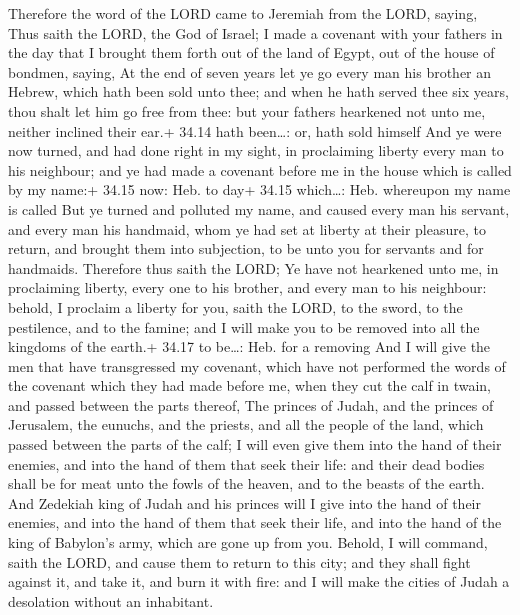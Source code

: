  Therefore the word of the LORD came to Jeremiah from the
LORD, saying,  Thus saith the LORD, the God of Israel; I
made a covenant with your fathers in the day that I brought them forth
out of the land of Egypt, out of the house of bondmen, saying,
 At the end of seven years let ye go every man his brother
an Hebrew, which hath been sold unto thee; and when he hath served thee
six years, thou shalt let him go free from thee: but your fathers
hearkened not unto me, neither inclined their ear.+ 34.14 hath
been\ldots: or, hath sold himself  And ye were now turned,
and had done right in my sight, in proclaiming liberty every man to his
neighbour; and ye had made a covenant before me in the house which is
called by my name:+ 34.15 now: Heb. to day+ 34.15 which\ldots: Heb.
whereupon my name is called  But ye turned and polluted my
name, and caused every man his servant, and every man his handmaid, whom
ye had set at liberty at their pleasure, to return, and brought them
into subjection, to be unto you for servants and for handmaids.
 Therefore thus saith the LORD; Ye have not hearkened unto
me, in proclaiming liberty, every one to his brother, and every man to
his neighbour: behold, I proclaim a liberty for you, saith the LORD, to
the sword, to the pestilence, and to the famine; and I will make you to
be removed into all the kingdoms of the earth.+ 34.17 to be\ldots: Heb.
for a removing  And I will give the men that have
transgressed my covenant, which have not performed the words of the
covenant which they had made before me, when they cut the calf in twain,
and passed between the parts thereof,  The princes of
Judah, and the princes of Jerusalem, the eunuchs, and the priests, and
all the people of the land, which passed between the parts of the calf;
 I will even give them into the hand of their enemies, and
into the hand of them that seek their life: and their dead bodies shall
be for meat unto the fowls of the heaven, and to the beasts of the
earth.  And Zedekiah king of Judah and his princes will I
give into the hand of their enemies, and into the hand of them that seek
their life, and into the hand of the king of Babylon's army, which are
gone up from you.  Behold, I will command, saith the LORD,
and cause them to return to this city; and they shall fight against it,
and take it, and burn it with fire: and I will make the cities of Judah
a desolation without an inhabitant.

